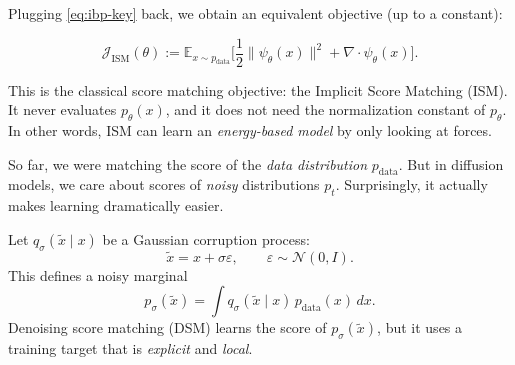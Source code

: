 \documentclass[../main]{subfiles}
\begin{document}
Plugging \eqref{eq:ibp-key} back, we obtain an equivalent objective (up to a constant):
\begin{theorem}
\begin{equation}\label{eq:esm-final}
    \mathcal J_{\mathrm{ISM}}(\theta)
    := \mathbb E_{x\sim p_{\mathrm{data}}}\Big[
        \frac12 \|\psi_\theta(x)\|^2 + \nabla\cdot \psi_\theta(x)
    \Big].
\end{equation}
\end{theorem}
This is the classical score matching objective: the Implicit Score Matching (ISM). It never evaluates $p_\theta(x)$, and it does not need
the normalization constant of $p_\theta$.
In other words, ISM can learn an \emph{energy-based model} by only looking at forces.
\vspace{0.5em}

So far, we were matching the score of the \emph{data distribution} $p_{\mathrm{data}}$.
But in diffusion models, we care about scores of \emph{noisy} distributions $p_t$.
Surprisingly, it actually makes learning dramatically easier.

Let $q_\sigma(\tilde x \mid x)$ be a Gaussian corruption process:
\begin{equation}\label{eq:gaussian-corrupt}
    \tilde x = x + \sigma \varepsilon,\qquad \varepsilon\sim\mathcal N(0,I).
\end{equation}
This defines a noisy marginal
\begin{equation}
    p_\sigma(\tilde x) = \int q_\sigma(\tilde x\mid x)\, p_{\mathrm{data}}(x)\,dx.
\end{equation}
Denoising score matching (DSM) learns the score of $p_\sigma(\tilde x)$,
but it uses a training target that is \emph{explicit} and \emph{local}.
\end{document}
